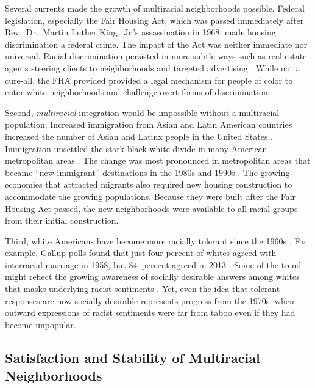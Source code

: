 \documentclass{baderart}
\renewcommand{\needcite}[1][]{%
	\strong{[CITE: %
		\ifthenelse{\equal{#1}{}}{}{: #1}	%
	]}}
\begin{document}
Several currents made the growth of multiracial neighborhoods possible. Federal legislation, especially the Fair Housing Act, which was passed immediately after Rev.~Dr.~Martin Luther King,~Jr.'s assassination in 1968, made housing discrimination a federal crime. The impact of the Act was neither immediate nor universal. Racial discrimination persisted in more subtle ways such as real-estate agents steering clients to neighborhoods and targeted advertising \citep{ross_housing_2005, roscigno_complexities_2009}. While not a cure-all, the FHA provided provided a legal mechanism for people of color to enter white neighborhoods and challenge overt forms of discrimination. 

Second, \emph{multiracial} integration would be impossible without a multiracial population. Increased immigration from Asian and Latin American countries increased the number of Asian and Latinx people in the United States \citep{denton_patterns_1991, frey_latino_1996, singer_rise_2001}. Immigration unsettled the stark black-white divide in many American metropolitan areas \citep{alba_neighborhood_1995, logan_segregation_2004, friedman_declines_2008}. The change was most pronounced in metropolitan areas that became ``new immigrant'' destinations in the 1980s and 1990s \citep{singer_rise_2001, lichter_immigrant_2009}. The growing economies that attracted migrants also required new housing construction to accommodate the growing populations. Because they were built after the Fair Housing Act passed, the new neighborhoods were available to all racial groups from their initial construction. 

Third, white Americans have become more racially tolerant since the 1960s \citep{schuman_racial_1997}. For example, Gallup polls found that just four percent of whites agreed with interracial marriage in 1958, but 84~percent agreed in 2013 \citep{newport_u.s._2013}. 
Some of the trend might reflect the growing awareness of socially desirable answers among whites that masks underlying racist sentiments \citep{jackman_education_1984, bonilla-silva_racism_2003}. Yet, even the idea that tolerant responses are now socially desirable represents progress from the 1970s, when outward expressions of racist sentiments were far from taboo even if they had become unpopular.

\subsection{Satisfaction and Stability of Multiracial Neighborhoods}\label{sec:satisfaction-stability}
\end{document}
